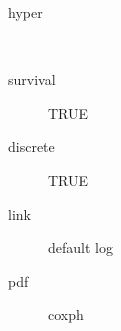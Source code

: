 \begin{description}
	\item[hyper]\ 
	 \item[ survival ] TRUE 
	 \item[ discrete ] TRUE 
	 \item[ link ] default log 
	 \item[ pdf ] coxph 
\end{description}
